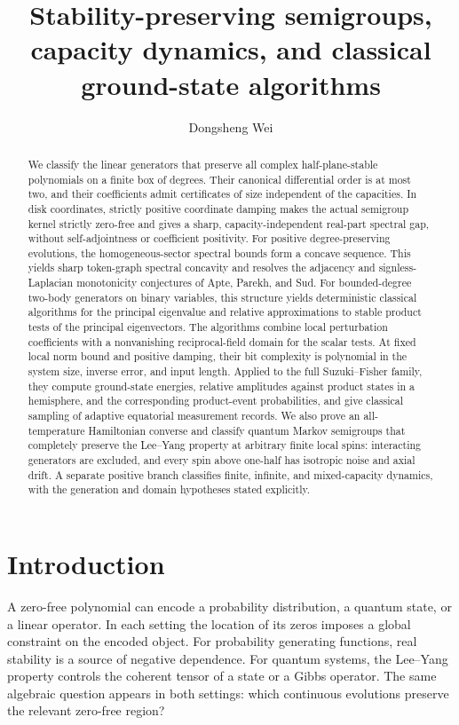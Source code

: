 \documentclass[reqno]{amsart}
\title[Stability semigroups and ground-state algorithms]{Stability-preserving semigroups,\\ capacity dynamics, and classical\\ ground-state algorithms}
\author{Dongsheng Wei}
\date{}
\theoremstyle{definition}
\theoremstyle{remark}
\begin{document}
\begin{abstract}
We classify the linear generators that preserve all complex
half-plane-stable polynomials on a finite box of degrees. Their canonical
differential order is at most two, and their coefficients admit
certificates of size independent of the capacities. In disk coordinates,
strictly positive coordinate damping makes the actual semigroup kernel
strictly zero-free and gives a sharp, capacity-independent real-part
spectral gap, without self-adjointness or coefficient positivity.
For positive degree-preserving evolutions, the homogeneous-sector
spectral bounds form a concave sequence. This yields sharp
token-graph spectral concavity and resolves the adjacency and
signless-Laplacian monotonicity conjectures of Apte, Parekh, and Sud.
For bounded-degree two-body generators on binary variables, this structure yields
deterministic classical algorithms for the principal eigenvalue and
relative approximations to stable product tests of the principal eigenvectors. The algorithms
combine local perturbation coefficients with a nonvanishing
reciprocal-field domain for the scalar tests. At fixed local norm bound
and positive damping, their bit complexity is polynomial in the system
size, inverse error, and input length. Applied to the full
Suzuki--Fisher family, they compute ground-state energies, relative
amplitudes against product states in a hemisphere, and the corresponding product-event
probabilities, and give classical sampling of adaptive equatorial
measurement records. We also prove an all-temperature Hamiltonian
converse and classify quantum Markov semigroups that completely preserve
the Lee--Yang property at arbitrary finite local spins: interacting generators are excluded,
and every spin above one-half has isotropic noise and axial drift.
A separate positive branch classifies finite, infinite, and
mixed-capacity dynamics, with the generation and domain hypotheses
stated explicitly.
\end{abstract}
\maketitle
\clearpage
\tableofcontents
\section{Introduction}\label{intro:section}

A zero-free polynomial can encode a probability distribution, a quantum
state, or a linear operator. In each setting the location of its zeros
imposes a global constraint on the encoded object. For probability
generating functions, real stability is a source of negative dependence.
For quantum systems, the Lee--Yang property controls the coherent tensor
of a state or a Gibbs operator. The same algebraic question appears in both
settings: which continuous evolutions preserve the relevant zero-free
region?
\end{document}
